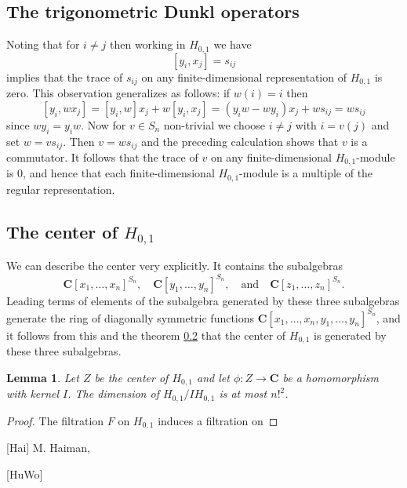 \documentclass[12pt, reqno]{amsart}
\numberwithin{equation}{section}
\theoremstyle{definition}
\theoremstyle{plain}
\newtheorem{lemma}[theorem]{Lemma}
\newcommand{\CC}{\mathbf{C}}
\begin{document}
\subsection{The trigonometric Dunkl operators} 

Noting that for $i \neq j$ then working in $H_{0,1}$ we have
$$[y_i,x_j]=s_{ij}$$ implies that the trace of $s_{ij}$ on any finite-dimensional representation of $H_{0,1}$ is zero. This observation generalizes as follows: if $w(i)=i$ then $$[y_i,w x_j]=[y_i,w]x_j+w[y_i,x_j]=(y_i w-wy_i)x_j+w s_{ij}=w s_{ij}$$ since $wy_i=y_i w$. Now for $v \in S_n$ non-trivial we choose $i \neq j$ with $i=v(j)$ and set $w=v s_{ij}$. Then $v=w s_{ij}$ and the preceding calculation shows that $v$ is a commutator. It follows that the trace of $v$ on any finite-dimensional $H_{0,1}$-module is $0$, and hence that each finite-dimensional $H_{0,1}$-module is a multiple of the regular representation.

\subsection{The center of $H_{0,1}$} We can describe the center very explicitly. It contains the subalgebras $$\CC[x_1,\dots,x_n]^{S_n}, \quad \CC[y_1,\dots,y_n]^{S_n}, \quad \text{and} \quad \CC[z_1,\dots,z_n]^{S_n}.$$ Leading terms of elements of the subalgebra generated by these three subalgebras generate the ring of diagonally symmetric functions $\CC[x_1,\dots,x_n,y_1,\dots,y_n]^{S_n}$, and it follows from this and the theorem \ref{} that the center of $H_{0,1}$ is generated by these three subalgebras.

\begin{lemma}
Let $Z$ be the center of $H_{0,1}$ and let $\phi:Z \rightarrow \CC$ be a homomorphism with kernel $I$. The dimension of $H_{0,1}/I H_{0,1}$ is at most $n!^2$.\end{lemma}
\begin{proof}
The filtration $F$ on $H_{0,1}$ induces a filtration on 	
\end{proof}


%
\def\cprime{$'$} \def\cprime{$'$}
\begin{thebibliography}{GGOR}

[Hai]
 M. Haiman, \emph{}
 
 [HuWo] 
 
 \end{thebibliography}
\end{document}
